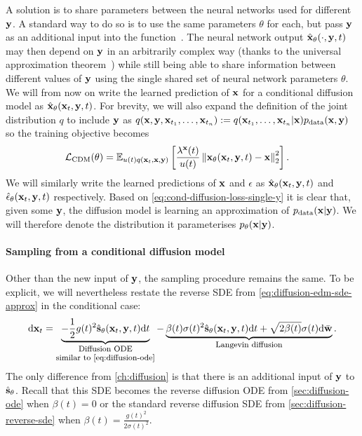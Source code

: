 A solution is to share parameters between the neural networks used for different ${\mathbf{y}}$. A standard way to do so is to use the same parameters $\theta$ for each, but pass ${\mathbf{y}}$ as an additional input into the function~\citep{sohn2015learning}. The neural network output $\hat{{\mathbf{x}}}_\theta(\cdot, {\mathbf{y}}, t)$ may then depend on ${\mathbf{y}}$ in an arbitrarily complex way (thanks to the universal approximation theorem~\citep{hornik1989multilayer}) while still being able to share information between different values of ${\mathbf{y}}$ using the single shared set of neural network parameters $\theta$. We will from now on write the learned prediction of ${\mathbf{x}}$ for a conditional diffusion model as $\hat{{\mathbf{x}}}_\theta({\mathbf{x}}_t, {\mathbf{y}}, t)$. For brevity, we will also expand the definition of the joint distribution $q$ to include ${\mathbf{y}}$ as $q({\mathbf{x}},{\mathbf{y}},{\mathbf{x}}_{t_1},\ldots,{\mathbf{x}}_{t_n}) := q({\mathbf{x}}_{t_1},\ldots,{\mathbf{x}}_{t_n}|{\mathbf{x}})p_{\rm{data}}({\mathbf{x}},{\mathbf{y}})$ so the training objective becomes
\begin{align} \label{eq:cond-diffusion-loss}
    {\mathcal{L}}_\text{CDM}(\theta) &= \mathbb{E}_{u(t)q({\mathbf{x}}_t, {\mathbf{x}}, {\mathbf{y}})} \left[ \frac{\lambda^{\mathbf{x}}(t)}{u(t)} 
    \left\| {\mathbf{x}}_{\theta}({\mathbf{x}}_t, {\mathbf{y}}, t) - {\mathbf{x}} \right\|_2^2 \right].
\end{align}
We will similarly write the learned predictions of ${\mathbf{x}}$ and $\epsilon$ as $\hat{{\mathbf{x}}}_{\theta}({\mathbf{x}}_t, {\mathbf{y}}, t)$ and $\hat{\mathbf{\epsilon}}_{\theta}({\mathbf{x}}_t, {\mathbf{y}}, t)$ respectively.
Based on \cref{eq:cond-diffusion-loss-single-y} it is clear that, given some ${\mathbf{y}}$, the diffusion model is learning an approximation of $p_{\rm{data}}({\mathbf{x}}|{\mathbf{y}})$. We will therefore denote the distribution it parameterises $p_\theta({\mathbf{x}}|{\mathbf{y}})$.

\paragraph{Sampling from a conditional diffusion model}
Other than the new input of ${\mathbf{y}}$, the sampling procedure remains the same. To be explicit, we will nevertheless restate the reverse SDE from \cref{eq:diffusion-edm-sde-approx} in the conditional case:
\begin{align}
    \mathrm{d}\rvx_t = \underbrace{- \frac{1}{2} g(t)^2 \preds_\theta(\rvx_t, \rvy, t) \mathrm{d}t}_{\shortstack{\footnotesize Diffusion ODE \\ \footnotesize similar to \cref{eq:diffusion-ode}}} - \underbrace{\beta(t) \sigma(t)^2 \preds_\theta(\rvx_t, \rvy, t) \mathrm{d}t + \sqrt{2\beta(t)}\sigma(t)\mathrm{d}\bar{\rvw}}_\text{\footnotesize Langevin diffusion}.
\end{align}
The only difference from \cref{ch:diffusion} is that there is an additional input of ${\mathbf{y}}$ to $\hat{{\mathbf{s}}}_\theta$. Recall that this SDE becomes the reverse diffusion ODE from \cref{sec:diffusion-ode} when $\beta(t) = 0$ or the standard reverse diffusion SDE from \cref{sec:diffusion-reverse-sde} when $\beta(t) = \frac{g(t)^2}{2 \sigma(t)^2}$.

